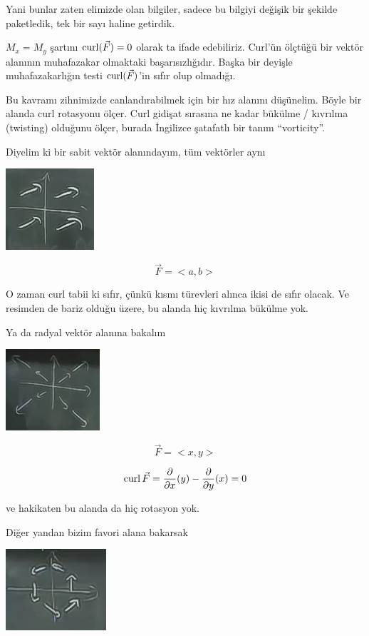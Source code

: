 \documentclass[12pt,fleqn]{article}\usepackage{../../common}
\begin{document}
Yani bunlar zaten elimizde olan bilgiler, sadece bu bilgiyi değişik bir şekilde
paketledik, tek bir sayı haline getirdik.

$M_x = M_y$ şartını $\operatorname{curl}(\vec{F}) = 0$ olarak ta ifade edebiliriz. Curl'ün
ölçtüğü bir vektör alanının muhafazakar olmaktaki başarısızlığıdır. Başka bir
deyişle muhafazakarlığın testi $\operatorname{curl}(\vec{F})$'in sıfır olup olmadığı.


Bu kavramı zihnimizde canlandırabilmek için bir hız alanını düşünelim. Böyle bir
alanda curl rotasyonu ölçer. Curl gidişat sırasına ne kadar bükülme / kıvrılma
(twisting) olduğunu ölçer, burada İngilizce şatafatlı bir tanım ``vorticity''.


Diyelim ki bir sabit vektör alanındayım, tüm vektörler aynı
\begin{center}
\includegraphics[height=3cm]{21_5.png}
\end{center}
$$ \vec{F} = < a,b > $$

O zaman curl tabii ki sıfır, çünkü kısmı türevleri alınca ikisi de sıfır
olacak. Ve resimden de bariz olduğu üzere, bu alanda hiç kıvrılma bükülme yok.

Ya da radyal vektör alanına bakalım
\begin{center}
\includegraphics[height=3cm]{21_6.png}
\end{center}
$$ \vec{F}= < x,y > $$

$$
\operatorname{curl} \vec{F} =
\frac{\partial }{\partial x}(y) -
\frac{\partial }{\partial y}(x) = 0
$$

ve hakikaten bu alanda da hiç rotasyon yok. 

Diğer yandan bizim favori alana bakarsak
\begin{center}
\includegraphics[height=3cm]{21_1.png}
\end{center}
\end{document}
